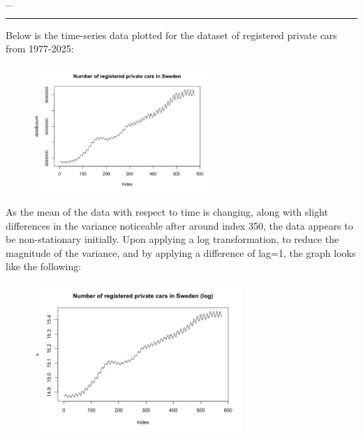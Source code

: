 \documentclass[a4paper,11pt]{article}
\begin{document}
    \_    
    \hrule

    Below is the time-series data plotted for the dataset of registered private cars from 1977-2025:

    \begin{figure}[H]
        \centering
        \includegraphics[width=0.6\textwidth]{figure-markdown_strict/unnamed-chunk-1-1.png}
        \label{fig:f1}
    \end{figure}

    As the mean of the data with respect to time is changing, along with slight differences in the variance noticeable after around index 350, the data appears to be non-stationary initially. Upon applying a log transformation, to reduce the magnitude of the variance, and by applying a difference of lag=1, the graph looks like the following:

    \begin{figure}[H]
        \centering
        \includegraphics[width=0.7\textwidth]{figure-markdown_strict/unnamed-chunk-1-2.png}
        \label{fig:f2}
    \end{figure}
\end{document}
